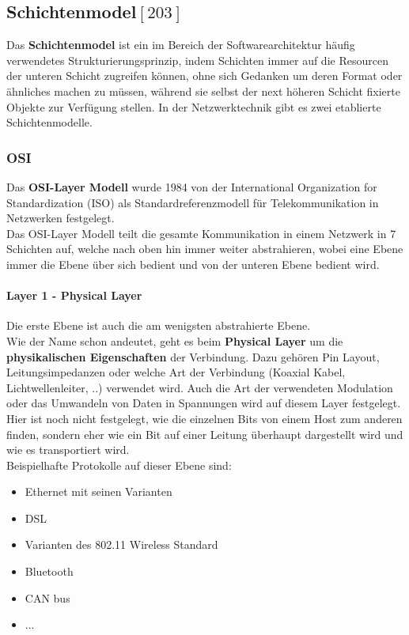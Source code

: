 \documentclass[12pt,a4paper]{report}
\begin{document}
\begin{onehalfspace}
\subsection{Schichtenmodel${[203]}$}
Das \textbf{Schichtenmodel} ist ein im Bereich der Softwarearchitektur häufig verwendetes Strukturierungsprinzip, indem Schichten immer auf die Resourcen der unteren Schicht zugreifen können, ohne sich Gedanken um deren Format oder ähnliches machen zu müssen, während sie selbst der next höheren Schicht fixierte Objekte zur Verfügung stellen. In der Netzwerktechnik gibt es zwei etablierte Schichtenmodelle.
\subsubsection{OSI}
Das \textbf{OSI-Layer Modell} wurde 1984 von der International Organization for Standardization (ISO) als Standardreferenzmodell für Telekommunikation in Netzwerken festgelegt.\\
Das OSI-Layer Modell teilt die gesamte Kommunikation in einem Netzwerk in 7 Schichten auf, welche nach oben hin immer weiter abstrahieren, wobei eine Ebene immer die Ebene über sich bedient und von der unteren Ebene bedient wird.\\
\paragraph{Layer 1 - Physical Layer}
Die erste Ebene ist auch die am wenigsten abstrahierte Ebene.\\
Wie der Name schon andeutet, geht es beim \textbf{Physical Layer} um die \textbf{physikalischen Eigenschaften} der Verbindung. Dazu gehören Pin Layout, Leitungsimpedanzen oder welche Art der Verbindung (Koaxial Kabel, Lichtwellenleiter, ..) verwendet wird. Auch die Art der verwendeten Modulation oder das Umwandeln von Daten in Spannungen wird auf diesem Layer festgelegt.\\
Hier ist noch nicht festgelegt, wie die einzelnen Bits von einem Host zum anderen finden, sondern eher wie ein Bit auf einer Leitung überhaupt dargestellt wird und wie es transportiert wird.\\

Beispielhafte Protokolle auf dieser Ebene sind:
\begin{itemize}
\item Ethernet mit seinen Varianten
\item DSL 
\item Varianten des 802.11 Wireless Standard
\item Bluetooth
\item CAN bus
\item ...
\end{itemize}

\end{onehalfspace}
\end{document}
